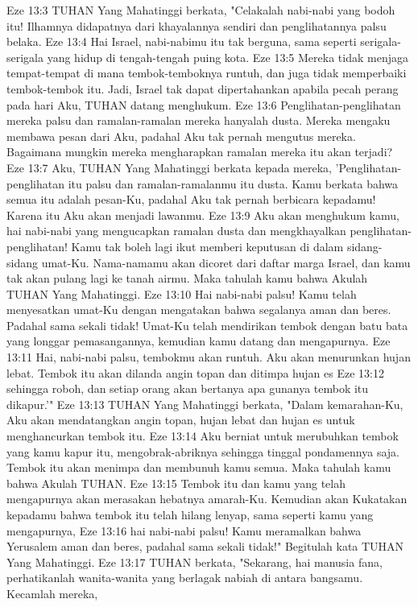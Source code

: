 Eze 13:3  TUHAN Yang Mahatinggi berkata, "Celakalah nabi-nabi yang bodoh itu! Ilhamnya didapatnya dari khayalannya sendiri dan penglihatannya palsu belaka.
Eze 13:4  Hai Israel, nabi-nabimu itu tak berguna, sama seperti serigala-serigala yang hidup di tengah-tengah puing kota.
Eze 13:5  Mereka tidak menjaga tempat-tempat di mana tembok-temboknya runtuh, dan juga tidak memperbaiki tembok-tembok itu. Jadi, Israel tak dapat dipertahankan apabila pecah perang pada hari Aku, TUHAN datang menghukum.
Eze 13:6  Penglihatan-penglihatan mereka palsu dan ramalan-ramalan mereka hanyalah dusta. Mereka mengaku membawa pesan dari Aku, padahal Aku tak pernah mengutus mereka. Bagaimana mungkin mereka mengharapkan ramalan mereka itu akan terjadi?
Eze 13:7  Aku, TUHAN Yang Mahatinggi berkata kepada mereka, 'Penglihatan-penglihatan itu palsu dan ramalan-ramalanmu itu dusta. Kamu berkata bahwa semua itu adalah pesan-Ku, padahal Aku tak pernah berbicara kepadamu! Karena itu Aku akan menjadi lawanmu.
Eze 13:9  Aku akan menghukum kamu, hai nabi-nabi yang mengucapkan ramalan dusta dan mengkhayalkan penglihatan-penglihatan! Kamu tak boleh lagi ikut memberi keputusan di dalam sidang-sidang umat-Ku. Nama-namamu akan dicoret dari daftar marga Israel, dan kamu tak akan pulang lagi ke tanah airmu. Maka tahulah kamu bahwa Akulah TUHAN Yang Mahatinggi.
Eze 13:10  Hai nabi-nabi palsu! Kamu telah menyesatkan umat-Ku dengan mengatakan bahwa segalanya aman dan beres. Padahal sama sekali tidak! Umat-Ku telah mendirikan tembok dengan batu bata yang longgar pemasangannya, kemudian kamu datang dan mengapurnya.
Eze 13:11  Hai, nabi-nabi palsu, tembokmu akan runtuh. Aku akan menurunkan hujan lebat. Tembok itu akan dilanda angin topan dan ditimpa hujan es
Eze 13:12  sehingga roboh, dan setiap orang akan bertanya apa gunanya tembok itu dikapur.'"
Eze 13:13  TUHAN Yang Mahatinggi berkata, "Dalam kemarahan-Ku, Aku akan mendatangkan angin topan, hujan lebat dan hujan es untuk menghancurkan tembok itu.
Eze 13:14  Aku berniat untuk merubuhkan tembok yang kamu kapur itu, mengobrak-abriknya sehingga tinggal pondamennya saja. Tembok itu akan menimpa dan membunuh kamu semua. Maka tahulah kamu bahwa Akulah TUHAN.
Eze 13:15  Tembok itu dan kamu yang telah mengapurnya akan merasakan hebatnya amarah-Ku. Kemudian akan Kukatakan kepadamu bahwa tembok itu telah hilang lenyap, sama seperti kamu yang mengapurnya,
Eze 13:16  hai nabi-nabi palsu! Kamu meramalkan bahwa Yerusalem aman dan beres, padahal sama sekali tidak!" Begitulah kata TUHAN Yang Mahatinggi.
Eze 13:17  TUHAN berkata, "Sekarang, hai manusia fana, perhatikanlah wanita-wanita yang berlagak nabiah di antara bangsamu. Kecamlah mereka,
